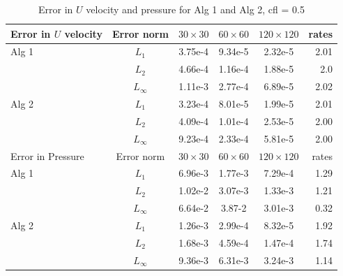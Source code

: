 \begin{table}[H]
  \begin{center}
    \begin{tabular}{| l | c | c c c | r |}
    \hline
    Error in $U$ velocity & Error norm & $30 \times 30$ & $60 \times 60$ & $120 \times 120$ & rates \\
    \hline
    Alg 1
     & $L_1$ & 3.75e-4 & 9.34e-5 & 2.32e-5 & 2.01 \\
     & $L_2$ & 4.66e-4 & 1.16e-4 & 1.88e-5 & 2.0 \\
     & $L_\infty$ & 1.11e-3 & 2.77e-4 & 6.89e-5 & 2.02\\
    \hline
    Alg 2
     & $L_1$ & 3.23e-4 & 8.01e-5 & 1.99e-5 & 2.01 \\
     & $L_2$ & 4.09e-4 & 1.01e-4 & 2.53e-5 & 2.00 \\
     & $L_\infty$ & 9.23e-4 & 2.33e-4 & 5.81e-5 & 2.00\\
    \hline
    \hline
     Error in Pressure & Error norm & $30 \times 30$ & $60 \times 60$ & $120 \times 120$ & rates \\
     \hline
     Alg 1
     & $L_1$ & 6.96e-3 & 1.77e-3 & 7.29e-4 & 1.29 \\
     & $L_2$ & 1.02e-2 & 3.07e-3 & 1.33e-3 & 1.21 \\
     & $L_\infty$ & 6.64e-2 & 3.87-2 & 3.01e-3 & 0.32\\
    \hline
    Alg 2
     & $L_1$ & 1.26e-3 & 2.99e-4 & 8.32e-5 & 1.92 \\
     & $L_2$ & 1.68e-3 & 4.59e-4 & 1.47e-4 & 1.74 \\
     & $L_\infty$ & 9.36e-3 & 6.31e-3 & 3.24e-3 & 1.14\\
	\hline
    \end{tabular}
  \end{center}
  \caption{Error in $U$ velocity and pressure for Alg 1 and Alg 2, cfl = 0.5}
\end{table}\label{table:error for comparison between Alg 1 and Alg 2}

